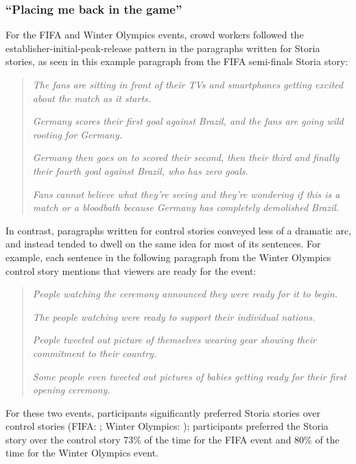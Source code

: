 \subsubsection{``Placing me back in the game''}
For the FIFA and Winter Olympics events, crowd workers followed the establisher-initial-peak-release pattern in the paragraphs written for Storia stories, as seen in this example paragraph from the FIFA semi-finals Storia story:

\begin{quote}
\emph{The fans are sitting in front of their TVs and smartphones getting excited about the match as it starts.}

\emph{Germany scores their first goal against Brazil, and the fans are going wild rooting for Germany.}

\emph{Germany then goes on to scored their second, then their third and finally their fourth goal against Brazil, who has zero goals.}

\emph{Fans cannot believe what they're seeing and they're wondering if this is a match or a bloodbath because Germany has completely demolished Brazil.}
\end{quote}

In contrast, paragraphs written for control stories conveyed less of a dramatic arc, and instead tended to dwell on the same idea for most of its sentences. For example, each sentence in the following paragraph from the Winter Olympics control story mentions that viewers are ready for the event: 

\begin{quote}
\emph{People watching the ceremony announced they were ready for it to begin.}

\emph{The people watching were ready to support their individual nations.}

\emph{People tweeted out picture of themselves wearing gear showing their commitment to their country.}

\emph{Some people even tweeted out pictures of babies getting ready for their first opening ceremony.}
\end{quote}











For these two events, participants significantly preferred Storia stories over control stories (FIFA: ; Winter Olympics: ); participants preferred the Storia story over the control story 73\% of the time for the FIFA event and 80\% of the time for the Winter Olympics event.


